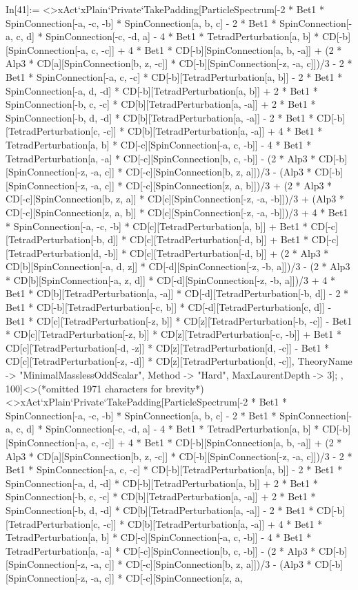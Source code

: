 In[41]:= <>xAct`xPlain`Private`TakePadding[ParticleSpectrum[-2 * Bet1 * SpinConnection[-a, -c, -b] * SpinConnection[a, b, c] - 2 * Bet1 * SpinConnection[-a, c, d] * SpinConnection[-c, -d, a] - 4 * Bet1 * TetradPerturbation[a, b] * CD[-b][SpinConnection[-a, c, -c]] + 4 * Bet1 * CD[-b][SpinConnection[a, b, -a]] + (2 * Alp3 * CD[a][SpinConnection[b, z, -c]] * CD[-b][SpinConnection[-z, -a, c]])/3 - 2 * Bet1 * SpinConnection[-a, c, -c] * CD[-b][TetradPerturbation[a, b]] - 2 * Bet1 * SpinConnection[-a, d, -d] * CD[-b][TetradPerturbation[a, b]] + 2 * Bet1 * SpinConnection[-b, c, -c] * CD[b][TetradPerturbation[a, -a]] + 2 * Bet1 * SpinConnection[-b, d, -d] * CD[b][TetradPerturbation[a, -a]] - 2 * Bet1 * CD[-b][TetradPerturbation[c, -c]] * CD[b][TetradPerturbation[a, -a]] + 4 * Bet1 * TetradPerturbation[a, b] * CD[-c][SpinConnection[-a, c, -b]] - 4 * Bet1 * TetradPerturbation[a, -a] * CD[-c][SpinConnection[b, c, -b]] - (2 * Alp3 * CD[-b][SpinConnection[-z, -a, c]] * CD[-c][SpinConnection[b, z, a]])/3 - (Alp3 * CD[-b][SpinConnection[-z, -a, c]] * CD[-c][SpinConnection[z, a, b]])/3 + (2 * Alp3 * CD[-c][SpinConnection[b, z, a]] * CD[c][SpinConnection[-z, -a, -b]])/3 + (Alp3 * CD[-c][SpinConnection[z, a, b]] * CD[c][SpinConnection[-z, -a, -b]])/3 + 4 * Bet1 * SpinConnection[-a, -c, -b] * CD[c][TetradPerturbation[a, b]] + Bet1 * CD[-c][TetradPerturbation[-b, d]] * CD[c][TetradPerturbation[-d, b]] + Bet1 * CD[-c][TetradPerturbation[d, -b]] * CD[c][TetradPerturbation[-d, b]] + (2 * Alp3 * CD[b][SpinConnection[-a, d, z]] * CD[-d][SpinConnection[-z, -b, a]])/3 - (2 * Alp3 * CD[b][SpinConnection[-a, z, d]] * CD[-d][SpinConnection[-z, -b, a]])/3 + 4 * Bet1 * CD[b][TetradPerturbation[a, -a]] * CD[-d][TetradPerturbation[-b, d]] - 2 * Bet1 * CD[-b][TetradPerturbation[-c, b]] * CD[-d][TetradPerturbation[c, d]] - Bet1 * CD[c][TetradPerturbation[-z, b]] * CD[z][TetradPerturbation[-b, -c]] - Bet1 * CD[c][TetradPerturbation[-z, b]] * CD[z][TetradPerturbation[-c, -b]] + Bet1 * CD[c][TetradPerturbation[-d, -z]] * CD[z][TetradPerturbation[d, -c]] - Bet1 * CD[c][TetradPerturbation[-z, -d]] * CD[z][TetradPerturbation[d, -c]], TheoryName -> "MinimalMasslessOddScalar", Method -> "Hard", MaxLaurentDepth -> 3]; , 100]<>(*omitted 1971 characters for brevity*)<>xAct`xPlain`Private`TakePadding[ParticleSpectrum[-2 * Bet1 * SpinConnection[-a, -c, -b] * SpinConnection[a, b, c] - 2 * Bet1 * SpinConnection[-a, c, d] * SpinConnection[-c, -d, a] - 4 * Bet1 * TetradPerturbation[a, b] * CD[-b][SpinConnection[-a, c, -c]] + 4 * Bet1 * CD[-b][SpinConnection[a, b, -a]] + (2 * Alp3 * CD[a][SpinConnection[b, z, -c]] * CD[-b][SpinConnection[-z, -a, c]])/3 - 2 * Bet1 * SpinConnection[-a, c, -c] * CD[-b][TetradPerturbation[a, b]] - 2 * Bet1 * SpinConnection[-a, d, -d] * CD[-b][TetradPerturbation[a, b]] + 2 * Bet1 * SpinConnection[-b, c, -c] * CD[b][TetradPerturbation[a, -a]] + 2 * Bet1 * SpinConnection[-b, d, -d] * CD[b][TetradPerturbation[a, -a]] - 2 * Bet1 * CD[-b][TetradPerturbation[c, -c]] * CD[b][TetradPerturbation[a, -a]] + 4 * Bet1 * TetradPerturbation[a, b] * CD[-c][SpinConnection[-a, c, -b]] - 4 * Bet1 * TetradPerturbation[a, -a] * CD[-c][SpinConnection[b, c, -b]] - (2 * Alp3 * CD[-b][SpinConnection[-z, -a, c]] * CD[-c][SpinConnection[b, z, a]])/3 - (Alp3 * CD[-b][SpinConnection[-z, -a, c]] * CD[-c][SpinConnection[z, a, 